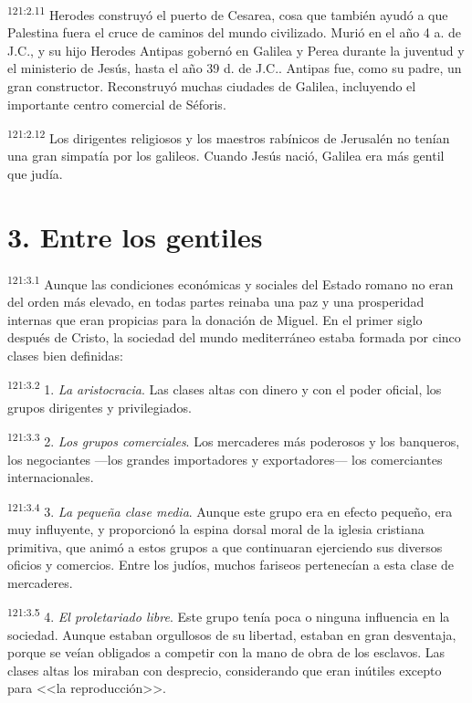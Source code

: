 \par 
\textsuperscript{121:2.11} Herodes construyó el puerto de Cesarea, cosa que también ayudó a que Palestina fuera el cruce de caminos del mundo civilizado. Murió en el año 4 a. de J.C., y su hijo Herodes Antipas gobernó en Galilea y Perea durante la juventud y el ministerio de Jesús, hasta el año 39 d. de J.C.. Antipas fue, como su padre, un gran constructor. Reconstruyó muchas ciudades de Galilea, incluyendo el importante centro comercial de Séforis.

\par 
\textsuperscript{121:2.12} Los dirigentes religiosos y los maestros rabínicos de Jerusalén no tenían una gran simpatía por los galileos. Cuando Jesús nació, Galilea era más gentil que judía.

\section*{3. Entre los gentiles}
\par 
\textsuperscript{121:3.1} Aunque las condiciones económicas y sociales del Estado romano no eran del orden más elevado, en todas partes reinaba una paz y una prosperidad internas que eran propicias para la donación de Miguel. En el primer siglo después de Cristo, la sociedad del mundo mediterráneo estaba formada por cinco clases bien definidas:

\par 
\textsuperscript{121:3.2} 1. \textit{La aristocracia}. Las clases altas con dinero y con el poder oficial, los grupos dirigentes y privilegiados.

\par 
\textsuperscript{121:3.3} 2. \textit{Los grupos comerciales}. Los mercaderes más poderosos y los banqueros, los negociantes ---los grandes importadores y exportadores--- los comerciantes internacionales.

\par 
\textsuperscript{121:3.4} 3. \textit{La pequeña clase media}. Aunque este grupo era en efecto pequeño, era muy influyente, y proporcionó la espina dorsal moral de la iglesia cristiana primitiva, que animó a estos grupos a que continuaran ejerciendo sus diversos oficios y comercios. Entre los judíos, muchos fariseos pertenecían a esta clase de mercaderes.

\par 
\textsuperscript{121:3.5} 4. \textit{El proletariado libre}. Este grupo tenía poca o ninguna influencia en la sociedad. Aunque estaban orgullosos de su libertad, estaban en gran desventaja, porque se veían obligados a competir con la mano de obra de los esclavos. Las clases altas los miraban con desprecio, considerando que eran inútiles excepto para <<la reproducción>>.

